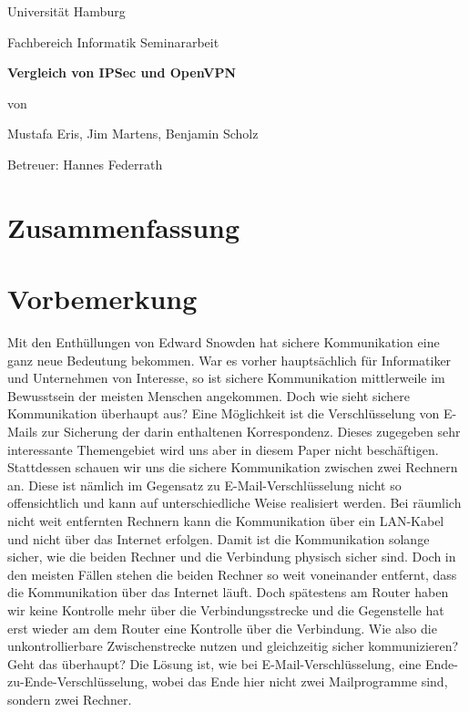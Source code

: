 \documentclass[12pt]{scrartcl}
\begin{document}

\newpage
\thispagestyle{empty}
\begin{center}\Large
Universität Hamburg \par
Fachbereich Informatik
\vfill
Seminararbeit
\vfill
{\Large\textsf{\textbf{Vergleich von IPSec und OpenVPN}}\par}
\vfill
von 
\par\bigskip
Mustafa Eris, Jim Martens, Benjamin Scholz \par
Betreuer: Hannes Federrath \par
\end{center}

\newpage
\section*{Zusammenfassung}


\newpage
\tableofcontents

\newpage
\section{Vorbemerkung}
Mit den Enthüllungen von Edward Snowden hat sichere Kommunikation eine ganz neue Bedeutung bekommen. War es vorher hauptsächlich für Informatiker und Unternehmen von Interesse, so ist sichere Kommunikation mittlerweile im Bewusstsein der meisten Menschen angekommen. Doch wie sieht sichere Kommunikation überhaupt aus? Eine Möglichkeit ist die Verschlüsselung von E-Mails zur Sicherung der darin enthaltenen Korrespondenz. Dieses zugegeben sehr interessante Themengebiet wird uns aber in diesem Paper nicht beschäftigen. Stattdessen schauen wir uns die sichere Kommunikation zwischen zwei Rechnern an. Diese ist nämlich im Gegensatz zu E-Mail-Verschlüsselung nicht so offensichtlich und kann auf unterschiedliche Weise realisiert werden. Bei räumlich nicht weit entfernten Rechnern kann die Kommunikation über ein LAN-Kabel und nicht über das Internet erfolgen. Damit ist die Kommunikation solange sicher, wie die beiden Rechner und die Verbindung physisch sicher sind. Doch in den meisten Fällen stehen die beiden Rechner so weit voneinander entfernt, dass die Kommunikation über das Internet läuft. Doch spätestens am Router haben wir keine Kontrolle mehr über die Verbindungsstrecke und die Gegenstelle hat erst wieder am dem Router eine Kontrolle über die Verbindung. Wie also die unkontrollierbare Zwischenstrecke nutzen und gleichzeitig sicher kommunizieren? Geht das überhaupt? Die Lösung ist, wie bei E-Mail-Verschlüsselung, eine Ende-zu-Ende-Verschlüsselung, wobei das Ende hier nicht zwei Mailprogramme sind, sondern zwei Rechner.
\end{document}
